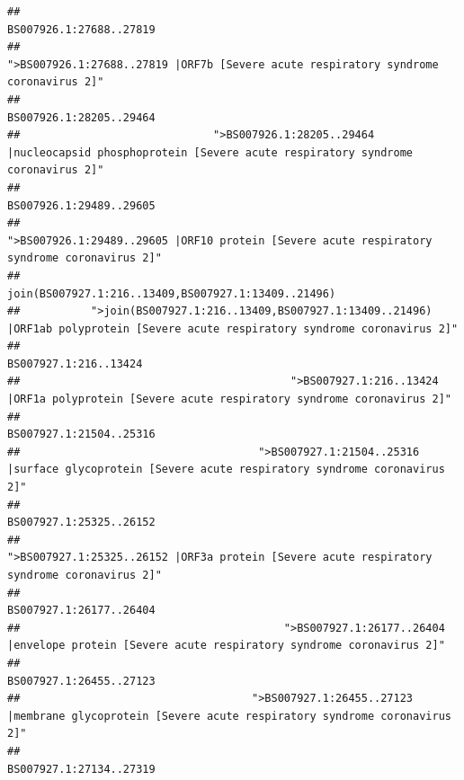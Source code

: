 \documentclass[
]{article}
\begin{document}
\begin{verbatim}
##                                                                                                                BS007926.1:27688..27819 
##                                                    ">BS007926.1:27688..27819 |ORF7b [Severe acute respiratory syndrome coronavirus 2]" 
##                                                                                                                BS007926.1:28205..29464 
##                              ">BS007926.1:28205..29464 |nucleocapsid phosphoprotein [Severe acute respiratory syndrome coronavirus 2]" 
##                                                                                                                BS007926.1:29489..29605 
##                                            ">BS007926.1:29489..29605 |ORF10 protein [Severe acute respiratory syndrome coronavirus 2]" 
##                                                                                    join(BS007927.1:216..13409,BS007927.1:13409..21496) 
##           ">join(BS007927.1:216..13409,BS007927.1:13409..21496) |ORF1ab polyprotein [Severe acute respiratory syndrome coronavirus 2]" 
##                                                                                                                  BS007927.1:216..13424 
##                                          ">BS007927.1:216..13424 |ORF1a polyprotein [Severe acute respiratory syndrome coronavirus 2]" 
##                                                                                                                BS007927.1:21504..25316 
##                                     ">BS007927.1:21504..25316 |surface glycoprotein [Severe acute respiratory syndrome coronavirus 2]" 
##                                                                                                                BS007927.1:25325..26152 
##                                            ">BS007927.1:25325..26152 |ORF3a protein [Severe acute respiratory syndrome coronavirus 2]" 
##                                                                                                                BS007927.1:26177..26404 
##                                         ">BS007927.1:26177..26404 |envelope protein [Severe acute respiratory syndrome coronavirus 2]" 
##                                                                                                                BS007927.1:26455..27123 
##                                    ">BS007927.1:26455..27123 |membrane glycoprotein [Severe acute respiratory syndrome coronavirus 2]" 
##                                                                                                                BS007927.1:27134..27319 

\end{verbatim}
\end{document}
